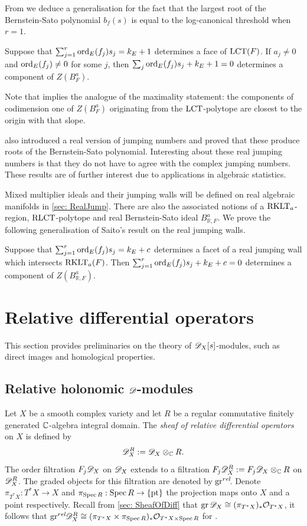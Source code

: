 From  we deduce a generalisation for the fact that the largest root of the Bernstein-Sato polynomial $b_f(s)$ is equal to the log-canonical threshold when $r=1$.
\begin{corollary}\label{thm: LCT}
  Suppose that $\sum_{j=1}^r \operatorname{ord}_E(f_j)s_j = k_E + 1$ determines a face of $\operatorname{LCT}(F)$. If $a_j\neq 0$ and $\operatorname{ord}_{E}(f_j)\neq 0$ for some $j$, then $\sum_j \operatorname{ord}_{E}(f_j)s_j +k_E + 1=0$ determines a component of $Z(B_F^a)$.
\end{corollary}
Note that  implies the analogue of the maximality statement: the components of codimension one of $Z(B_F^a)$ originating from the $\operatorname{LCT}$-polytope are closest to the origin with that slope.

\cite{RealLogCan} also introduced a real version of jumping numbers and proved that these produce roots of the Bernstein-Sato polynomial.
Interesting about these real jumping numbers is that they do not have to agree with the complex jumping numbers.
These results are of further interest due to applications in algebraic statistics.

Mixed multiplier ideals and their jumping walls will be defined on real algebraic manifolds in \cref{sec: RealJump}.
There are also the associated notions of a $\operatorname{RKLT}_a$-region,  $\operatorname{RLCT}$-polytope and real Bernstein-Sato ideal $B_{\mathbb{R},F}^a$.
We prove the following generalisation of Saito's result on the real jumping walls.
\begin{theorem}
  Suppose that $\sum_{j=1}^r \operatorname{ord}_E(f_j)s_j = k_E + c$ determines a facet of a real jumping wall which intersects $\operatorname{RKLT}_{a}(F)$.
  Then $\sum_{j=1}^r \operatorname{ord}_E(f_j)s_j + k_E + c = 0$ determines a component of $Z(B_{\mathbb{R},F}^a)$.
\end{theorem}

\section{Relative differential operators}\label{sec: DXS}
This section provides preliminaries on the theory of $\mathscr{D}_X[s]$-modules, such as direct images and homological properties.

\subsection{Relative holonomic $\mathscr{D}$-modules}\label{sec: RelHol}
Let $X$ be a smooth complex variety and let $R$ be a regular commutative finitely generated $\mathbb{C}$-algebra integral domain.
The {\it sheaf of relative differential operators} on $X$ is defined by
$$\mathscr{D}_X^R := \mathscr{D}_X \otimes_{\mathbb{C}} R.$$
The order filtration $F_j \mathscr{D}_X$ on $\mathscr{D}_X$ extends to a filtration $F_j \mathscr{D}_X^R := F_j\mathscr{D}_X\otimes_{\mathbb{C}} R$ on $\mathscr{D}_X^R$.
The graded objects for this filtration are denoted by $\operatorname{gr}^{rel}\mkern-5mu$.
Denote $\pi_{T^*X}:T^*X \to X$ and $\pi_{\operatorname{Spec} R}: \operatorname{Spec} R \to \{\operatorname{pt}\}$ the projection maps onto $X$ and a point respectively.
Recall from \cref{sec: SheafOfDiff} that $\operatorname{gr}\mathscr{D}_X \cong (\pi_{T^*X})_* \mathcal{O}_{T^*X}$, it follows that $\operatorname{gr}^{rel}\mkern-5mu\mathscr{D}_X^R \cong (\pi_{T^* X}\times \pi_{\operatorname{Spec} R})_*\mathcal{O}_{T^*X\times \operatorname{Spec} R}$ for .


